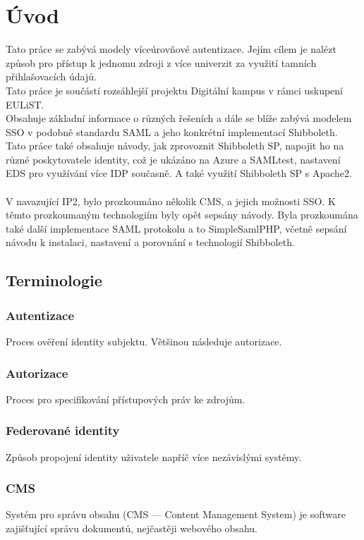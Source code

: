\chapter{Úvod}
Tato práce se zabývá modely víceúrovňové autentizace. Jejím cílem je nalézt způsob pro přístup k jednomu zdroji z více univerzit za využití tamních přihlašovacích údajů.\\
Tato práce je součástí rozsáhlejší projektu Digitální kampus v rámci uskupení EULiST.
\\
Obsahuje základní informace o různých řešeních a dále se blíže zabývá modelem SSO v podobně standardu SAML a jeho konkrétní implementací Shibboleth.\\
Tato práce také obsahuje návody, jak zprovoznit Shibboleth SP, napojit ho na různé poskytovatele identity, což je ukázáno na Azure a SAMLtest, nastavení EDS pro využívání více IDP současně. A také využití Shibboleth SP s Apache2.\\
\\%
V navazující IP2, bylo prozkoumáno několik CMS, a jejich možnosti SSO. K těmto prozkoumaným technologiím byly opět sepsány návody. Byla prozkoumána také další implementace SAML protokolu a to SimpleSamlPHP, včetně sepsání návodu k instalaci, nastavení a porovnání s technologií Shibboleth.



\section{Terminologie}
\subsection{Autentizace}
Proces ověření identity subjektu. Většinou následuje autorizace.\cite{Authorization}
\subsection{Autorizace}
Proces pro specifikování přístupových práv ke zdrojům.\cite{Autentizace}
 \subsection{Federované identity}
Způsob propojení identity uživatele napříč více nezávislými systémy. \cite{federatedIdentities}
\subsection{CMS} %
Systém pro správu obsahu (CMS --- Content Management System) je software zajišťující správu dokumentů, nejčastěji webového obsahu.\cite{cms}

